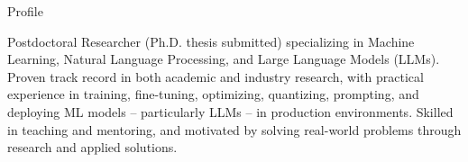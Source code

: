 


\begin{rubric}{Profile}
\begin{minipage}{\textwidth}
Postdoctoral Researcher (Ph.D. thesis submitted) specializing in Machine Learning, Natural Language Processing, and Large Language Models (LLMs). Proven track record in both academic and industry research, with practical experience in training, fine-tuning, optimizing, quantizing, prompting, and deploying ML models -- particularly LLMs -- in production environments. Skilled in teaching and mentoring, and motivated by solving real-world problems through research and applied solutions.
\end{minipage}
\end{rubric}